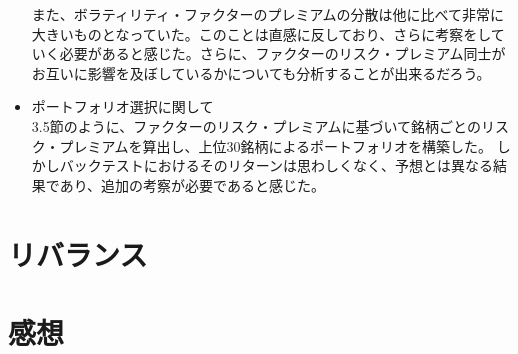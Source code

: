 \documentclass[11pt]{jreport}
\begin{document}
\begin{itemize}
\quad また、ボラティリティ・ファクターのプレミアムの分散は他に比べて非常に大きいものとなっていた。このことは直感に反しており、さらに考察をしていく必要があると感じた。さらに、ファクターのリスク・プレミアム同士がお互いに影響を及ぼしているかについても分析することが出来るだろう。
\item{ポートフォリオ選択に関して}\\
\quad 3.5節のように、ファクターのリスク・プレミアムに基づいて銘柄ごとのリスク・プレミアムを算出し、上位30銘柄によるポートフォリオを構築した。
しかしバックテストにおけるそのリターンは思わしくなく、予想とは異なる結果であり、追加の考察が必要であると感じた。

\end{itemize}

\chapter{リバランス}

\chapter{感想}
\end{document}
